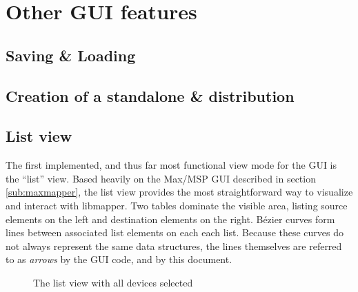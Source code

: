 \section{Other GUI features} %
\label{sec:other_gui_features}

	\subsection{Saving \& Loading} %
	\label{sec:saving_and_loading}
	

	\subsection{Creation of a standalone \& distribution} %
	\label{sec:creation_of_a_standalone_and_distribution}
	



\subsection{List view}
\label{sec:list_view}


The first implemented, and thus far most functional view mode for the GUI is the ``list'' view. Based heavily on the Max/MSP GUI described in section \ref{sub:maxmapper}, the list view provides the most straightforward way to visualize and interact with libmapper. Two tables dominate the visible area, listing source elements on the left and destination elements on the right. B\'ezier curves form lines between associated list elements on each each list. Because these curves do not always represent the same data structures, the lines themselves are referred to as \emph{arrows} by the GUI code, and by this document.

\begin{figure}[ht]
\centering
\caption{The list view with all devices selected}
\label{fig:list_view_all_devices}
\end{figure}


